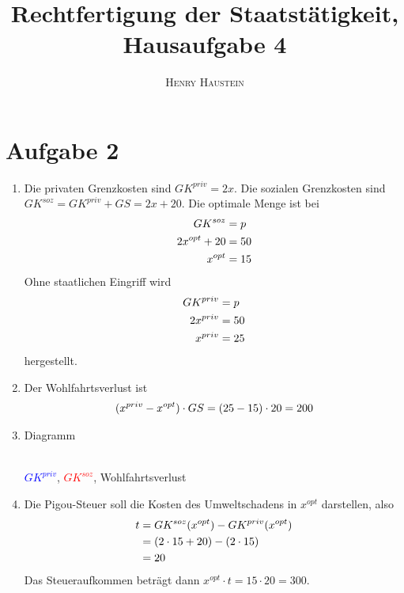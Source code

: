 \documentclass{article}
\title{\textbf{Rechtfertigung der Staatstätigkeit, Hausaufgabe 4}}
\author{\textsc{Henry Haustein}}
\date{}
\begin{document}
	\maketitle
	
	\section*{Aufgabe 2}
	\begin{enumerate}[label=(\alph*)]
		\item Die privaten Grenzkosten sind $GK^{priv}=2x$. Die sozialen Grenzkosten sind $GK^{soz}=GK^{priv} + GS = 2x + 20$. Die optimale Menge ist bei
		\begin{align}
			GK^{soz} &= p \notag \\
			2x^{opt} + 20 &= 50 \notag \\
			x^{opt} &= 15 \notag
		\end{align}
		Ohne staatlichen Eingriff wird
		\begin{align}
			GK^{priv} &= p \notag \\
			2x^{priv} &= 50 \notag \\
			x^{priv} &= 25 \notag
		\end{align}
		hergestellt.
		\item Der Wohlfahrtsverlust ist
		\begin{align}
			(x^{priv} - x^{opt}) \cdot GS = (25-15)\cdot 20 = 200 \notag
		\end{align}
		\item Diagramm
		\begin{center}
			 \\
			\textcolor{blue}{$GK^{priv}$}, \textcolor{red}{$GK^{soz}$}, \textcolor{green!80!black}{Wohlfahrtsverlust}
		\end{center}
		\item Die Pigou-Steuer soll die Kosten des Umweltschadens in $x^{opt}$ darstellen, also
		\begin{align}
			t &= GK^{soz}(x^{opt}) - GK^{priv}(x^{opt}) \notag \\
			&= (2\cdot 15+20) - (2\cdot 15) \notag \\
			&= 20 \notag
		\end{align}
		Das Steueraufkommen beträgt dann $x^{opt}\cdot t = 15\cdot 20 = 300$.
	\end{enumerate}
	
\end{document}
